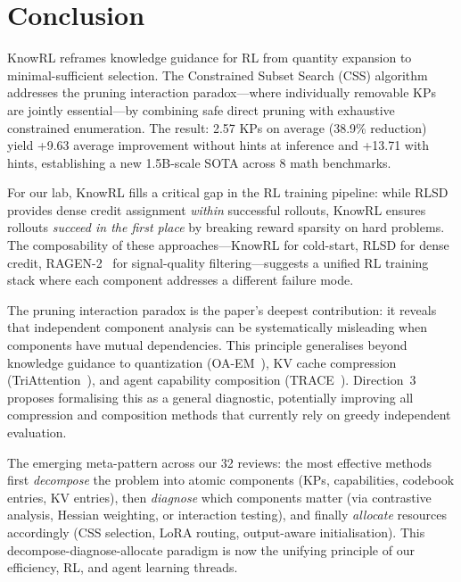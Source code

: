 \documentclass[11pt]{article}
\begin{document}
\section{Conclusion}

KnowRL reframes knowledge guidance for RL from quantity expansion to minimal-sufficient selection. The Constrained Subset Search (CSS) algorithm addresses the pruning interaction paradox---where individually removable KPs are jointly essential---by combining safe direct pruning with exhaustive constrained enumeration. The result: 2.57 KPs on average (38.9\% reduction) yield +9.63 average improvement without hints at inference and +13.71 with hints, establishing a new 1.5B-scale SOTA across 8 math benchmarks.

For our lab, KnowRL fills a critical gap in the RL training pipeline: while RLSD~\cite{rlsd} provides dense credit assignment \textit{within} successful rollouts, KnowRL ensures rollouts \textit{succeed in the first place} by breaking reward sparsity on hard problems. The composability of these approaches---KnowRL for cold-start, RLSD for dense credit, RAGEN-2~\cite{ragen2} for signal-quality filtering---suggests a unified RL training stack where each component addresses a different failure mode.

The pruning interaction paradox is the paper's deepest contribution: it reveals that independent component analysis can be systematically misleading when components have mutual dependencies. This principle generalises beyond knowledge guidance to quantization (OA-EM~\cite{oaem}), KV cache compression (TriAttention~\cite{triattention}), and agent capability composition (TRACE~\cite{trace}). Direction~3 proposes formalising this as a general diagnostic, potentially improving all compression and composition methods that currently rely on greedy independent evaluation.

The emerging meta-pattern across our 32 reviews: the most effective methods first \textit{decompose} the problem into atomic components (KPs, capabilities, codebook entries, KV entries), then \textit{diagnose} which components matter (via contrastive analysis, Hessian weighting, or interaction testing), and finally \textit{allocate} resources accordingly (CSS selection, LoRA routing, output-aware initialisation). This decompose-diagnose-allocate paradigm is now the unifying principle of our efficiency, RL, and agent learning threads.
\end{document}
